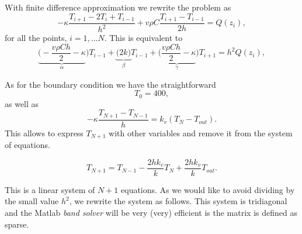 \documentclass[11pt,a4paper]{report}
\begin{document}
With finite difference approximation we rewrite the problem as 
$$-\kappa \dfrac{T_{i+1}-2T_{i}+T_{i-1}}{h^{2}}
+ v\rho C\dfrac{T_{i+1}-T_{i-1}}{2h}=Q(z_{i}),$$
for all the points, $i=1, \dots N$. This is equivalent to
$$\underbrace{\Big(-\dfrac{v\rho Ch}{2}  -\kappa    }_{\alpha}\Big) T_{i-1} 
+ \underbrace{\Big(2k\Big)}_{\beta} T_{i-1}
+ \underbrace{\Big( \dfrac{v\rho Ch}{2}  -\kappa    }_{\gamma}\Big) T_{i+1}
=h^{2}Q(z_{i}),$$


As for the boundary condition we have 
the straightforward $$T_{0}=400,$$
as well as
$$-\kappa \dfrac{T_{N+1}-T_{N-1}}{h}=k_{v}(T_{N}-T_{out}).$$
This allows to express $T_{N+1}$ with other variables and remove it from the system of equations.

$$T_{N+1}=T_{N-1}-\dfrac{2hk_{v}}{k}T_{N}+\dfrac{2hk_{v}}{k}T_{out}.$$


This is a linear system of $N+1$ equations. As we would like to avoid dividing by the small value $h^2$, we rewrite the system as follows. This system is tridiagonal and the Matlab \textit{band solver} will be very (very) efficient is the matrix is defined as sparse.
\end{document}
